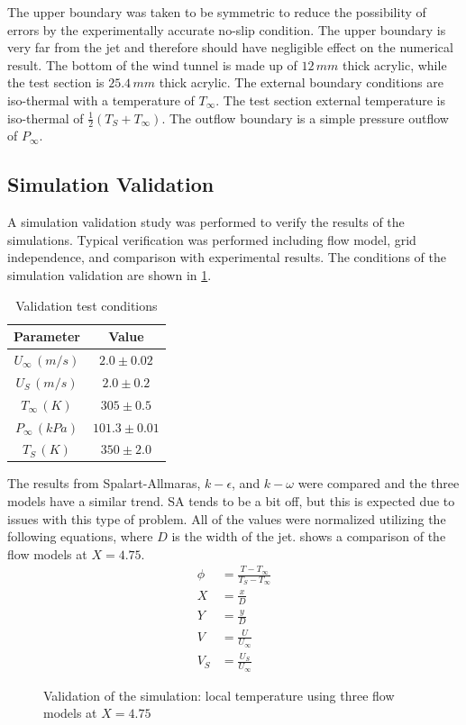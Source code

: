 \documentclass[preprint,12pt]{elsarticle}
\begin{document}
The upper boundary was taken to be symmetric to reduce the possibility of errors by the experimentally accurate no-slip condition.  The upper boundary is very far from the jet and therefore should have negligible effect on the numerical result.  The bottom of the wind tunnel is made up of $12\, mm$ thick acrylic, while the test section is $25.4\,mm$ thick acrylic.  The external boundary conditions are iso-thermal with a temperature of $T_{\infty}$.  The test section external temperature is iso-thermal of $\frac{1}{2}\left(T_S+T_{\infty}\right)$.  The outflow boundary is a simple pressure outflow of $P_{\infty}$.

\subsection{Simulation Validation}
A simulation validation study was performed to verify the results of the simulations.  Typical verification was performed including flow model, grid independence, and comparison with experimental results.  The conditions of the simulation validation are shown in \cref{tab:VTjet}.

\begin{table}[!t!b!p]
\begin{center}
\begin{tabular}{ c c }
\hline
Parameter    & Value \\ \hline
$U_{\infty} \, (m/s)$ & $2.0\pm0.02$ \\
$U_S \, (m/s)$ & $2.0\pm0.2$ \\
$T_{\infty} \, (K) $ & $305\pm0.5$ \\
$P_{\infty} \, (kPa) $ & $101.3\pm0.01$ \\
$T_{S} \, (K) $ & $350\pm2.0$ \\ \hline
\end{tabular}
\caption{Validation test conditions}
\label{tab:VTjet}
\end{center}
\end{table}

The results from Spalart-Allmaras, $k-\epsilon$, and $k-\omega$ were compared and the three models have a similar trend.  SA tends to be a bit off, but this is expected due to issues with this type of problem\cite{fluent}.  All of the values were normalized utilizing the following equations, where $D$ is the width of the jet.   shows a comparison of the flow models at $X=4.75$.
\begin{subequations}
\begin{align}
\phi &= \frac{T-T_{\infty}}{T_S-T_{\infty}} \\
X &= \frac{x}{D} \\
Y &= \frac{y}{D} \\
V &= \frac{U}{U_\infty}  \\
V_S &= \frac{U_S}{U_{\infty}}
\end{align}
\end{subequations}
\begin{figure}[!tbp]
	\centering
  \setlength\figureheight{5cm} 
	\setlength\figurewidth{5cm}
	
	\caption{Validation of the simulation: local temperature using three flow models at $X=4.75$}
	\label{fig:jetmodel15mm}
\end{figure}
\end{document}
